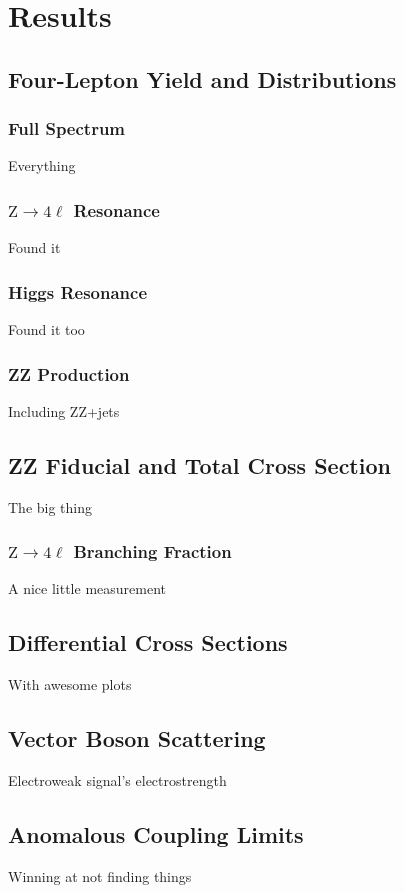 \chapter{Results}

\section{Four-Lepton Yield and Distributions}

\subsection{Full Spectrum}
Everything


\subsection{\texorpdfstring{$\mathrm{Z} \to 4\ell$}{Z to 4l} Resonance}
Found it


\subsection{Higgs Resonance}
Found it too


\subsection{ZZ Production}
Including ZZ+jets



\section{ZZ Fiducial and Total Cross Section}
The big thing

\subsection{\texorpdfstring{$\mathrm{Z} \to 4\ell$}{Z to 4l} Branching  Fraction}
A nice little measurement



\section{Differential Cross Sections}
With awesome plots



\section{Vector Boson Scattering}
Electroweak signal's electrostrength



\section{Anomalous Coupling Limits}
Winning at not finding things

